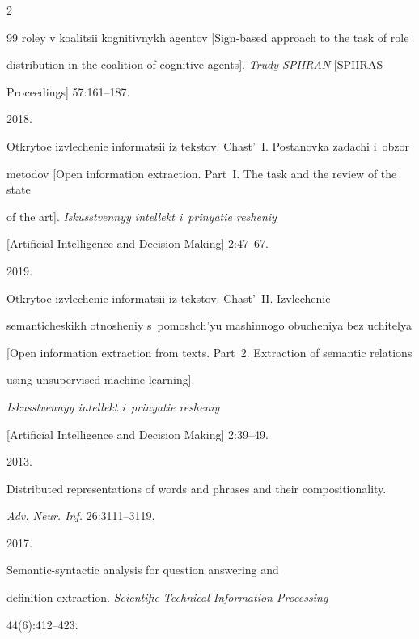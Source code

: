 \begin{multicols}{2}
{{\begin{thebibliography}{99}
roley v koalitsii kognitivnykh agentov [Sign-based approach to the task of role 


distribution in the coalition of cognitive agents]. \textit{Trudy SPIIRAN} [SPIIRAS 


Proceedings] 57:161--187.




   2018. 


Otkrytoe izvlechenie informatsii iz tekstov. Chast'~I. Postanovka zadachi i~obzor 


metodov [Open information extraction. Part~I. The task and the review of the state 


of the art]. \textit{Iskusstvennyy intellekt i~prinyatie resheniy} 


[Artificial Intelligence and  Decision Making] 2:47--67.




   2019. 


Otkrytoe izvlechenie informatsii iz tekstov. Chast'~II. Izvlechenie 


semanticheskikh otnosheniy s~pomoshch'yu mashinnogo obucheniya bez uchitelya 


[Open information extraction from texts. Part~2. Extraction of semantic relations 


using unsupervised machine learning]. 


\textit{Iskusstvennyy intellekt i~prinyatie resheniy} 


[Artificial Intelligence and Decision Making] 2:39--49. 




   2013. 


Distributed representations of words and phrases and their compositionality. 


\textit{Adv. Neur. Inf.} 26:3111--3119.




   2017. 


Semantic-syntactic analysis for question answering and 


definition extraction. \textit{Scientific Technical Information Processing}


44(6):412--423.



\end{thebibliography}}}
\end{multicols}
